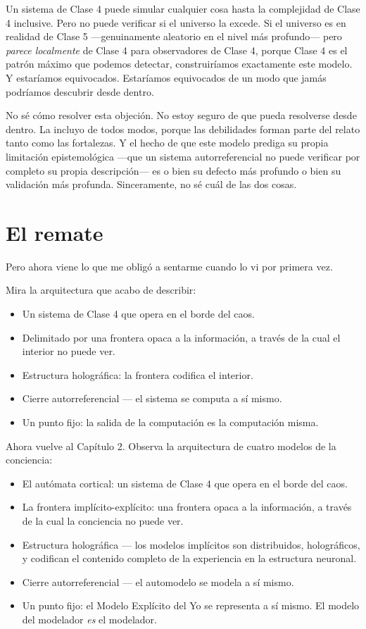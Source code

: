 \documentclass[11pt, twoside, openright]{book}
\begin{document}
Un sistema de Clase 4 puede simular cualquier cosa hasta la complejidad de Clase 4 inclusive. Pero no puede verificar si el universo la excede. Si el universo es en realidad de Clase 5 ---genuinamente aleatorio en el nivel más profundo--- pero \textit{parece localmente} de Clase 4 para observadores de Clase 4, porque Clase 4 es el patrón máximo que podemos detectar, construiríamos exactamente este modelo. Y estaríamos equivocados. Estaríamos equivocados de un modo que jamás podríamos descubrir desde dentro.

No sé cómo resolver esta objeción. No estoy seguro de que pueda resolverse desde dentro. La incluyo de todos modos, porque las debilidades forman parte del relato tanto como las fortalezas. Y el hecho de que este modelo prediga su propia limitación epistemológica ---que un sistema autorreferencial no puede verificar por completo su propia descripción--- es o bien su defecto más profundo o bien su validación más profunda. Sinceramente, no sé cuál de las dos cosas.


\section*{El remate}

Pero ahora viene lo que me obligó a sentarme cuando lo vi por primera vez.

Mira la arquitectura que acabo de describir:

\begin{itemize}
  \item Un sistema de Clase 4 que opera en el borde del caos.
  \item Delimitado por una frontera opaca a la información, a través de la cual el interior no puede ver.
  \item Estructura holográfica: la frontera codifica el interior.
  \item Cierre autorreferencial --- el sistema se computa a sí mismo.
  \item Un punto fijo: la salida de la computación es la computación misma.
\end{itemize}

Ahora vuelve al Capítulo 2. Observa la arquitectura de cuatro modelos de la conciencia:

\begin{itemize}
  \item El autómata cortical: un sistema de Clase 4 que opera en el borde del caos.
  \item La frontera implícito-explícito: una frontera opaca a la información, a través de la cual la conciencia no puede ver.
  \item Estructura holográfica --- los modelos implícitos son distribuidos, holográficos, y codifican el contenido completo de la experiencia en la estructura neuronal.
  \item Cierre autorreferencial --- el automodelo se modela a sí mismo.
  \item Un punto fijo: el Modelo Explícito del Yo se representa a sí mismo. El modelo del modelador \textit{es} el modelador.
\end{itemize}
\end{document}
